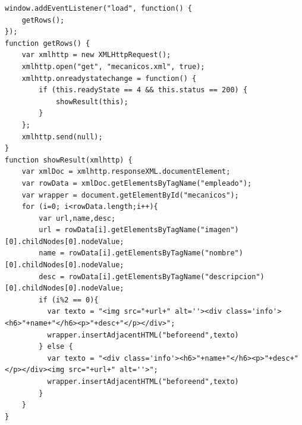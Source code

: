 \documentclass{article}
\begin{document}
{
  \begin{lstlisting}[caption=mecanicos.js]
window.addEventListener("load", function() {
	getRows();
});
function getRows() {
	var xmlhttp = new XMLHttpRequest();
	xmlhttp.open("get", "mecanicos.xml", true);
	xmlhttp.onreadystatechange = function() {
		if (this.readyState == 4 && this.status == 200) {
			showResult(this);
		}
	};
	xmlhttp.send(null);
}
function showResult(xmlhttp) {
    var xmlDoc = xmlhttp.responseXML.documentElement;
    var rowData = xmlDoc.getElementsByTagName("empleado");
    var wrapper = document.getElementById("mecanicos");
    for (i=0; i<rowData.length;i++){
        var url,name,desc;
        url = rowData[i].getElementsByTagName("imagen")[0].childNodes[0].nodeValue;
        name = rowData[i].getElementsByTagName("nombre")[0].childNodes[0].nodeValue;
        desc = rowData[i].getElementsByTagName("descripcion")[0].childNodes[0].nodeValue;
        if (i%2 == 0){
          var texto = "<img src="+url+" alt=''><div class='info'><h6>"+name+"</h6><p>"+desc+"</p></div>";
          wrapper.insertAdjacentHTML("beforeend",texto)
        } else {
          var texto = "<div class='info'><h6>"+name+"</h6><p>"+desc+"</p></div><img src="+url+" alt=''>";
          wrapper.insertAdjacentHTML("beforeend",texto)
        }
    }
}
\end{lstlisting}
}
\end{document}
